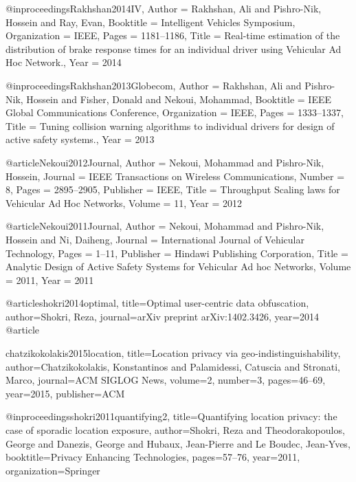 {{{{{	@inproceedings{Rakhshan2014IV,
	Author = {Rakhshan, Ali and Pishro-Nik, Hossein and Ray, Evan},
	Booktitle = {Intelligent Vehicles Symposium},
	Organization = {IEEE},
	Pages = {1181--1186},
	Title = {Real-time estimation of the distribution of brake response times for an individual driver using Vehicular Ad Hoc Network.},
	Year = {2014}}
	
	@inproceedings{Rakhshan2013Globecom,
	Author = {Rakhshan, Ali and Pishro-Nik, Hossein and Fisher, Donald and Nekoui, Mohammad},
	Booktitle = {IEEE Global Communications Conference},
	Organization = {IEEE},
	Pages = {1333--1337},
	Title = {Tuning collision warning algorithms to individual drivers for design of active safety systems.},
	Year = {2013}}
	
	@article{Nekoui2012Journal,
	Author = {Nekoui, Mohammad and Pishro-Nik, Hossein},
	Journal = {IEEE Transactions on Wireless Communications},
	Number = {8},
	Pages = {2895--2905},
	Publisher = {IEEE},
	Title = {Throughput Scaling laws for Vehicular Ad Hoc Networks},
	Volume = {11},
	Year = {2012}}
	
	
	
	
	
	
	
	
	
	@article{Nekoui2011Journal,
	Author = {Nekoui, Mohammad and Pishro-Nik, Hossein and Ni, Daiheng},
	Journal = {International Journal of Vehicular Technology},
	Pages = {1--11},
	Publisher = {Hindawi Publishing Corporation},
	Title = {Analytic Design of Active Safety Systems for Vehicular Ad hoc Networks},
	Volume = {2011},
	Year = {2011}}
	
	
	
	
	
	
	@article{shokri2014optimal,
	title={Optimal user-centric data obfuscation},
	author={Shokri, Reza},
	journal={arXiv preprint arXiv:1402.3426},
	year={2014}
	}
	@article{chatzikokolakis2015location,
	title={Location privacy via geo-indistinguishability},
	author={Chatzikokolakis, Konstantinos and Palamidessi, Catuscia and Stronati, Marco},
	journal={ACM SIGLOG News},
	volume={2},
	number={3},
	pages={46--69},
	year={2015},
	publisher={ACM}
	
	}
	@inproceedings{shokri2011quantifying2,
	title={Quantifying location privacy: the case of sporadic location exposure},
	author={Shokri, Reza and Theodorakopoulos, George and Danezis, George and Hubaux, Jean-Pierre and Le Boudec, Jean-Yves},
	booktitle={Privacy Enhancing Technologies},
	pages={57--76},
	year={2011},
	organization={Springer}
	}
	
}}}}}
